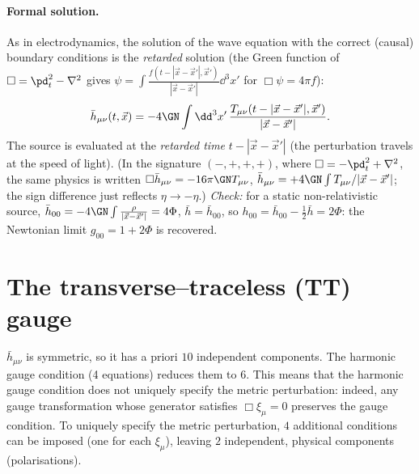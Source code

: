 \paragraph{Formal solution.} As in electrodynamics, the solution of the wave equation with the correct (causal) boundary conditions is the \emph{retarded} solution (the Green function of $\Box=\pd_t^2-\nabla^2$ gives $\psi=\int\frac{f(t-|\vec x-\vec x'|,\vec x')}{|\vec x-\vec x'|}\dd^3x'$ for $\Box\psi=4\pi f$):
\begin{equation}
  \bar h_{\mu\nu}(t,\vec x)=-4\GN\int\dd^3x'\,\frac{T_{\mu\nu}(t-|\vec x-\vec x'|,\vec x')}{|\vec x-\vec x'|}.
  \label{eq:retarded}
\end{equation}
The source is evaluated at the \emph{retarded time} $t-|\vec x-\vec x'|$ (the perturbation travels at the speed of light). (In the signature $(-,+,+,+)$, where $\Box=-\pd_t^2+\nabla^2$, the same physics is written $\Box\bar h_{\mu\nu}=-16\pi\GN T_{\mu\nu}$, $\bar h_{\mu\nu}=+4\GN\int T_{\mu\nu}/|\vec x-\vec x'|$; the sign difference just reflects $\eta\to-\eta$.) \textit{Check:} for a static non-relativistic source, $\bar h_{00}=-4\GN\int\frac{\rho}{|\vec x-\vec x'|}=4\Phi$, $\bar h=\bar h_{00}$, so $h_{00}=\bar h_{00}-\frac12\bar h=2\Phi$: the Newtonian limit $g_{00}=1+2\Phi$ is recovered.

\section{The transverse--traceless (TT) gauge}

$\bar h_{\mu\nu}$ is symmetric, so it has a priori $10$ independent components. The harmonic gauge condition (4 equations) reduces them to $6$. This means that the harmonic gauge condition does not uniquely specify the metric perturbation: indeed, any gauge transformation whose generator satisfies $\Box\xi_\mu=0$ preserves the gauge condition. To uniquely specify the metric perturbation, $4$ additional conditions can be imposed (one for each $\xi_\mu$), leaving $\boxed{2}$ independent, physical components (polarisations).

